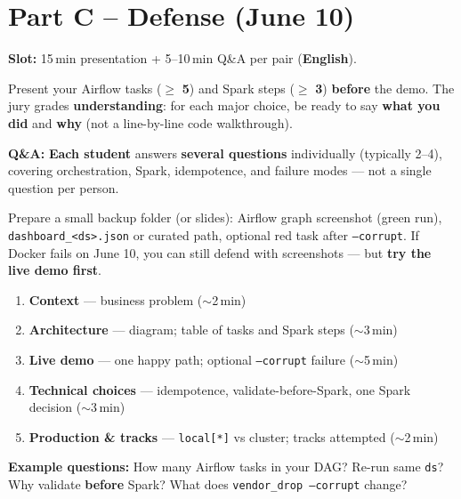 \documentclass[11pt,a4paper]{article}
\begin{document}
\section{Part C -- Defense (June 10)}
\label{sec:defense}

\textbf{Slot:} 15\,min presentation + 5--10\,min Q\&A per pair (\textbf{English}).

Present your Airflow tasks ($\geq$ \textbf{5}) and Spark steps ($\geq$ \textbf{3}) \textbf{before} the demo.
The jury grades \textbf{understanding}: for each major choice, be ready to say \textbf{what you did} and \textbf{why}
(not a line-by-line code walkthrough).

\textbf{Q\&A:} \textbf{Each student} answers \textbf{several questions} individually (typically 2--4),
covering orchestration, Spark, idempotence, and failure modes --- not a single question per person.

\begin{tipbox}[title=Backup if live demo fails]
Prepare a small backup folder (or slides): Airflow graph screenshot (green run),
\texttt{dashboard\_<ds>.json} or curated path, optional red task after \texttt{--corrupt}.
If Docker fails on June 10, you can still defend with screenshots --- but \textbf{try the live demo first}.
\end{tipbox}

\begin{enumerate}[label=\textbf{\arabic*.}]
  \item \textbf{Context} --- business problem ($\sim$2\,min)
  \item \textbf{Architecture} --- diagram; table of tasks and Spark steps ($\sim$3\,min)
  \item \textbf{Live demo} --- one happy path; optional \texttt{--corrupt} failure ($\sim$5\,min)
  \item \textbf{Technical choices} --- idempotence, validate-before-Spark, one Spark decision ($\sim$3\,min)
  \item \textbf{Production \& tracks} --- \texttt{local[*]} vs cluster; tracks attempted ($\sim$2\,min)
\end{enumerate}

\textbf{Example questions:} How many Airflow tasks in your DAG? Re-run same \texttt{ds}?
Why validate \textbf{before} Spark? What does \texttt{vendor\_drop --corrupt} change?

\appendix
\end{document}
